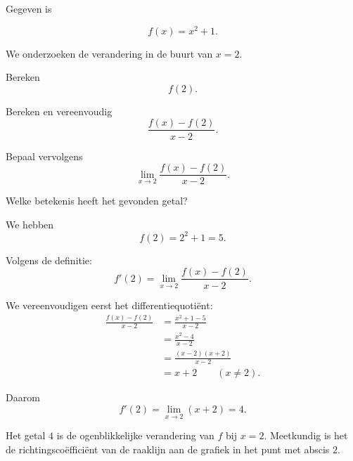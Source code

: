\documentclass{ximera}
\begin{document}
\begin{oefening}{\oefB\ESS}

Gegeven is

\[
f(x)=x^2+1.
\]

We onderzoeken de verandering in de buurt van $x=2$.

\begin{question}
Bereken
\[
f(2).
\]
\end{question}

\begin{question}
Bereken en vereenvoudig
\[
\frac{f(x)-f(2)}{x-2}.
\]
\end{question}

\begin{question}
Bepaal vervolgens
\[
\lim_{x\to2}
\frac{f(x)-f(2)}{x-2}.
\]
\end{question}

\begin{question}
Welke betekenis heeft het gevonden getal?
\end{question}

\begin{oplossing}

We hebben
\[
f(2)=2^2+1=5.
\]

Volgens de definitie:
\[
f'(2)
=
\lim_{x\to2}
\frac{f(x)-f(2)}{x-2}.
\]

We vereenvoudigen eerst het differentiequotiënt:
\[
\begin{aligned}
\frac{f(x)-f(2)}{x-2}
&=
\frac{x^2+1-5}{x-2}\\
&=
\frac{x^2-4}{x-2}\\
&=
\frac{(x-2)(x+2)}{x-2}\\
&=
x+2
\qquad (x\neq2).
\end{aligned}
\]

Daarom
\[
f'(2)
=
\lim_{x\to2}(x+2)
=
\boxed{4}.
\]

Het getal $4$ is de ogenblikkelijke verandering van $f$ bij $x=2$.
Meetkundig is het de richtingscoëfficiënt van de raaklijn aan de grafiek
in het punt met abscis $2$.

\end{oplossing}

\end{oefening}


\end{document}
